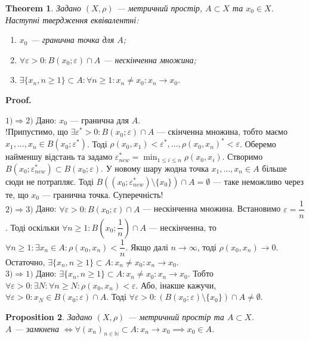 \documentclass[a4paper, 10pt]{article}
\makeatletter
\theoremstyle{theoremdd}
\newtheorem{theorem}{Theorem}[subsection]
\theoremstyle{theoremdd}
\theoremstyle{theoremdd}
\theoremstyle{theoremdd}
\theoremstyle{theoremdd}
\newtheorem{proposition}[theorem]{Proposition}
\theoremstyle{theoremdd}
\theoremstyle{theoremdd}
\theoremstyle{theoremdd}
\renewenvironment{proof}[1][Proof.\\]{\par
\pushQED{\hfill \qed}%
\normalfont \topsep6\p@\@plus6\p@\relax
\trivlist
\item\relax
{\bfseries
#1\@addpunct{.}}\hspace\labelsep\ignorespaces
}{%
\popQED\endtrivlist\@endpefalse
}
\makeatother
\begin{document}
\begin{theorem}
Задано $(X,\rho)$ --- метричний простір, $A \subset X$ та $x_0 \in X$. Наступні твердження еквівалентні:
\begin{enumerate}[nosep,wide=0pt,label={\arabic*)}]
\item $x_0$ --- гранична точка для $A$;
\item $\forall \varepsilon > 0: B(x_0;\varepsilon) \cap A$ --- нескінченна множина;
\item $\exists \{x_n, n \geq 1\} \subset A: \forall n \geq 1: x_n \neq x_0: x_n \to x_0$.
\end{enumerate}
\end{theorem}

\begin{proof}
$\boxed{1) \Rightarrow 2)}$ Дано: $x_0$ --- гранична для $A$.\\
!Припустимо, що $\exists \varepsilon^* > 0: B(x_0;\varepsilon) \cap A$ --- скінченна множина, тобто маємо  $x_1,\dots,x_n \in B(x_0;\varepsilon^*)$. Тоді $\rho(x_0,x_1) < \varepsilon^*, \dots, \rho(x_0,x_n)^* < \varepsilon$. Оберемо найменшу відстань та задамо $\varepsilon^*_{new} = \displaystyle \min_{1\leq i \leq n} \rho(x_0,x_i)$. Створимо $B(x_0;\varepsilon^*_{new}) \subset B(x_0; \varepsilon)$. У новому шару жодна точка $x_1,\dots,x_n \in A$ більше сюди не потрапляє. Тоді $B((x_0;\varepsilon^*_{new}) \setminus \{x_0\}) \cap A = \emptyset$ --- таке неможливо через те, що $x_0$ --- гранична точка. Суперечність!
\bigskip \\
$\boxed{2) \Rightarrow 3)}$ Дано: $\forall \varepsilon > 0: B(x_0;\varepsilon) \cap A$ --- нескінченна множина. Встановимо $\varepsilon = \dfrac{1}{n}$. Тоді оскільки $\forall n \geq 1: B \left(x_0;\dfrac{1}{n} \right) \cap A$ --- нескінченна, то $\forall n \geq 1: \exists x_n \in A: \rho(x_0,x_n) < \dfrac{1}{n}$. Якщо далі $n \to \infty$, тоді $\rho(x_0,x_n) \to 0$. Остаточно, $\exists \{x_n, n \geq 1\} \subset A: x_n \neq x_0: x_n \to x_0$.
\bigskip \\
$\boxed{3) \Rightarrow 1)}$ Дано: $\exists \{x_n, n \geq 1\} \subset A: x_n \neq x_0: x_n \to x_0$. Тобто $\forall \varepsilon > 0: \exists N: \forall n \geq N: \rho(x_0,x_n) < \varepsilon$. Або, інакше кажучи, $\forall \varepsilon > 0: x_N \in B(x_0;\varepsilon) \cap A$. Тоді $\forall \varepsilon > 0: (B(x_0;\varepsilon) \setminus \{x_0\}) \cap A \neq \emptyset$.
\end{proof}

\begin{proposition}
\label{closed_iff_limit_of_sequence_in_closed_set}
Задано $(X,\rho)$ --- метричний простір та $A \subset X$.\\
$A$ --- замкнена $\iff \forall (x_n)_{n \in \mathbb{N}} \subset A: x_n \to x_0 \implies x_0 \in A$.
\end{proposition}
\end{document}
